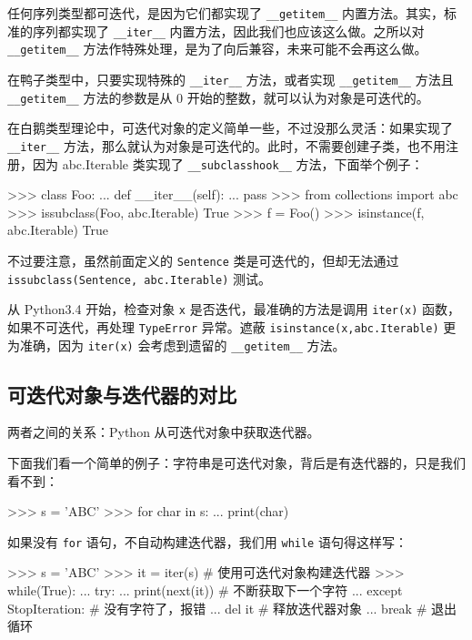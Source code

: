 任何序列类型都可迭代，是因为它们都实现了 \texttt{\_\_getitem\_\_} 内置方法。其实，标准的序列都实现了 \texttt{\_\_iter\_\_} 内置方法，因此我们也应该这么做。之所以对 \texttt{\_\_getitem\_\_} 方法作特殊处理，是为了向后兼容，未来可能不会再这么做。
 
在鸭子类型中，只要实现特殊的 \texttt{\_\_iter\_\_} 方法，或者实现 \texttt{\_\_getitem\_\_} 方法且 \texttt{\_\_getitem\_\_} 方法的参数是从 0 开始的整数，就可以认为对象是可迭代的。

在白鹅类型理论中，可迭代对象的定义简单一些，不过没那么灵活：如果实现了 \texttt{\_\_iter\_\_} 方法，那么就认为对象是可迭代的。此时，不需要创建子类，也不用注册，因为 abc.Iterable 类实现了 \texttt{\_\_subclasshook\_\_} 方法，下面举个例子：

\begin{python}
>>> class Foo:
...     def __iter__(self):
...         pass
>>> from collections import abc
>>> issubclass(Foo, abc.Iterable)
True 
>>> f = Foo()
>>> isinstance(f, abc.Iterable)
True
\end{python}

不过要注意，虽然前面定义的 \texttt{Sentence} 类是可迭代的，但却无法通过 \texttt{issubclass(Sentence, abc.Iterable)} 测试。

从 Python3.4 开始，检查对象 \texttt{x} 是否迭代，最准确的方法是调用 \texttt{iter(x)} 函数，如果不可迭代，再处理 \texttt{TypeError} 异常。遮蔽 \texttt{isinstance(x,abc.Iterable)} 更为准确，因为 \texttt{iter(x)} 会考虑到遗留的 \texttt{\_\_getitem\_\_} 方法。

\subsection{可迭代对象与迭代器的对比}

两者之间的关系：Python 从可迭代对象中获取迭代器。

下面我们看一个简单的例子：字符串是可迭代对象，背后是有迭代器的，只是我们看不到：
\begin{python}
>>> s = 'ABC'
>>> for char in s:
...     print(char)
\end{python}

如果没有 \texttt{for} 语句，不自动构建迭代器，我们用 \texttt{while} 语句得这样写：

\begin{python}
>>> s = 'ABC'
>>> it = iter(s)    # 使用可迭代对象构建迭代器
>>> while(True):
...     try:
...         print(next(it))     # 不断获取下一个字符
...     except StopIteration:   # 没有字符了，报错
...         del it              # 释放迭代器对象
...         break               # 退出循环
\end{python}


